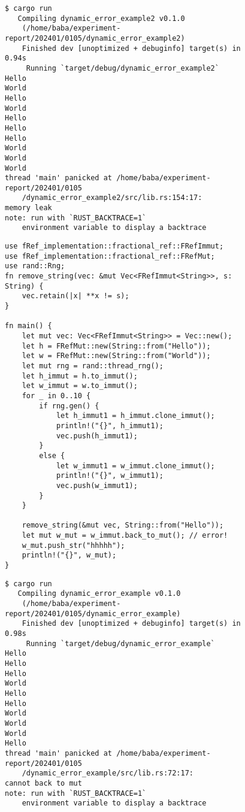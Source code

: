 \documentclass{sumiilab-paper}
\theoremstyle{mystyle}
\numberwithin{definition}{chapter} %
\begin{document}
\begin{figure}[p]
\begin{lstlisting}[caption=オブジェクトの解放し忘れのエラー, 
  label=error_result1, captionpos=b]
$ cargo run
   Compiling dynamic_error_example2 v0.1.0 
    (/home/baba/experiment-report/202401/0105/dynamic_error_example2)
    Finished dev [unoptimized + debuginfo] target(s) in 0.94s
     Running `target/debug/dynamic_error_example2`
Hello
World
Hello
World
Hello
Hello
Hello
World
World
World
thread 'main' panicked at /home/baba/experiment-report/202401/0105
    /dynamic_error_example2/src/lib.rs:154:17:
memory leak
note: run with `RUST_BACKTRACE=1` 
    environment variable to display a backtrace
\end{lstlisting}
\end{figure}

\begin{figure}[p]
\begin{lstlisting}[caption=Mutableな参照へ戻せないことを検出する例, 
  label=error_example2, captionpos=b]
use fRef_implementation::fractional_ref::FRefImmut;
use fRef_implementation::fractional_ref::FRefMut;
use rand::Rng;
fn remove_string(vec: &mut Vec<FRefImmut<String>>, s: String) {
    vec.retain(|x| **x != s);
}

fn main() {
    let mut vec: Vec<FRefImmut<String>> = Vec::new();
    let h = FRefMut::new(String::from("Hello"));
    let w = FRefMut::new(String::from("World"));
    let mut rng = rand::thread_rng();
    let h_immut = h.to_immut();
    let w_immut = w.to_immut();
    for _ in 0..10 {
        if rng.gen() {
            let h_immut1 = h_immut.clone_immut();
            println!("{}", h_immut1);
            vec.push(h_immut1);
        }
        else {
            let w_immut1 = w_immut.clone_immut();
            println!("{}", w_immut1);
            vec.push(w_immut1);
        }
    }

    remove_string(&mut vec, String::from("Hello"));
    let mut w_mut = w_immut.back_to_mut(); // error!
    w_mut.push_str("hhhhh");
    println!("{}", w_mut);
}
\end{lstlisting}
\end{figure}
\begin{figure}[p]
\begin{lstlisting}[caption=FRefMutに戻し忘れた際のエラー, 
  label=error_result2, captionpos=b]
$ cargo run
   Compiling dynamic_error_example v0.1.0
    (/home/baba/experiment-report/202401/0105/dynamic_error_example)
    Finished dev [unoptimized + debuginfo] target(s) in 0.98s
     Running `target/debug/dynamic_error_example`
Hello
Hello
Hello
World
Hello
Hello
World
World
World
Hello
thread 'main' panicked at /home/baba/experiment-report/202401/0105
    /dynamic_error_example/src/lib.rs:72:17:
cannot back to mut
note: run with `RUST_BACKTRACE=1` 
    environment variable to display a backtrace
\end{lstlisting}
\end{figure}
\end{document}
